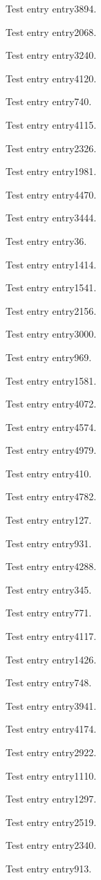 Test entry \gls{entry3894}.

Test entry \gls{entry2068}.

Test entry \gls{entry3240}.

Test entry \gls{entry4120}.

Test entry \gls{entry740}.

Test entry \gls{entry4115}.

Test entry \gls{entry2326}.

Test entry \gls{entry1981}.

Test entry \gls{entry4470}.

Test entry \gls{entry3444}.

Test entry \gls{entry36}.

Test entry \gls{entry1414}.

Test entry \gls{entry1541}.

Test entry \gls{entry2156}.

Test entry \gls{entry3000}.

Test entry \gls{entry969}.

Test entry \gls{entry1581}.

Test entry \gls{entry4072}.

Test entry \gls{entry4574}.

Test entry \gls{entry4979}.

Test entry \gls{entry410}.

Test entry \gls{entry4782}.

Test entry \gls{entry127}.

Test entry \gls{entry931}.

Test entry \gls{entry4288}.

Test entry \gls{entry345}.

Test entry \gls{entry771}.

Test entry \gls{entry4117}.

Test entry \gls{entry1426}.

Test entry \gls{entry748}.

Test entry \gls{entry3941}.

Test entry \gls{entry4174}.

Test entry \gls{entry2922}.

Test entry \gls{entry1110}.

Test entry \gls{entry1297}.

Test entry \gls{entry2519}.

Test entry \gls{entry2340}.

Test entry \gls{entry913}.

